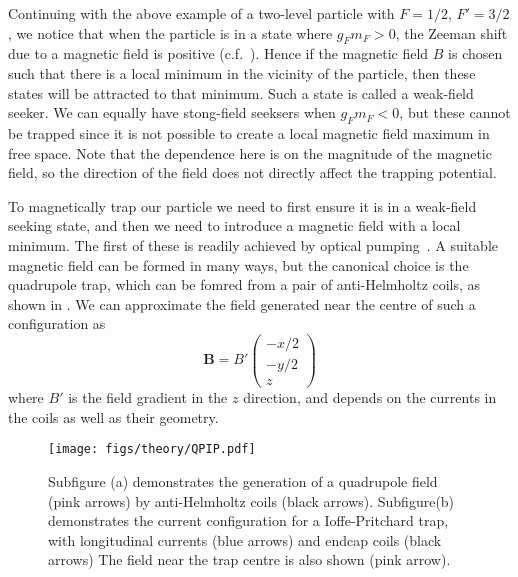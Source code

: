 Continuing with the above example of a two-level particle with $F=1/2$,
$F'=3/2$, we notice that when the particle is in a state where $g_F m_F > 0$,
the Zeeman shift due to a magnetic field is positive (c.f.\
). Hence if the magnetic field $B$ is chosen such
that there is a local minimum in the vicinity of the particle, then these
states will be attracted to that minimum. Such a state is called a weak-field
seeker. We can equally have stong-field seeksers when $g_F m_F < 0$, but these
cannot be trapped since it is not possible to create a local magnetic field
maximum in free space.
%
Note that the dependence here is on the magnitude of the magnetic field, so the
direction of the field does not directly affect the trapping potential.

To magnetically trap our particle we need to first ensure it is in a weak-field
seeking state, and then we need to introduce a magnetic field with a local
minimum. The first of these is readily achieved by optical
pumping~\cite{PhysRevLett.54.2596}.  A suitable magnetic field can be formed in
many ways, but the canonical choice is the quadrupole trap, which can be fomred
from a pair of anti-Helmholtz coils, as shown in
. We can approximate the field generated near
the centre of such a configuration as~\cite{Metcalf1999}
%
\begin{equation}
  \mathbf{B} = B'\begin{pmatrix} -x/2 \\ -y/2 \\ z \end{pmatrix}
  \label{theory:eqn:quadrupole}
\end{equation}
%
where $B'$ is the field gradient in the $z$ direction, and depends on the
currents in the coils as well as their geometry.

\begin{figure}
  \centering
  \texttt{[image: figs/theory/QPIP.pdf]}
  \caption{Subfigure (a) demonstrates the generation of a quadrupole field
    (pink arrows) by
  anti-Helmholtz coils (black arrows). Subfigure(b) demonstrates the current
  configuration for a
  Ioffe-Pritchard trap, with longitudinal currents (blue arrows) and endcap
coils (black arrows) The field near the trap centre is also shown (pink arrow).
}
  \label{theory:fig:fields}
\end{figure}

